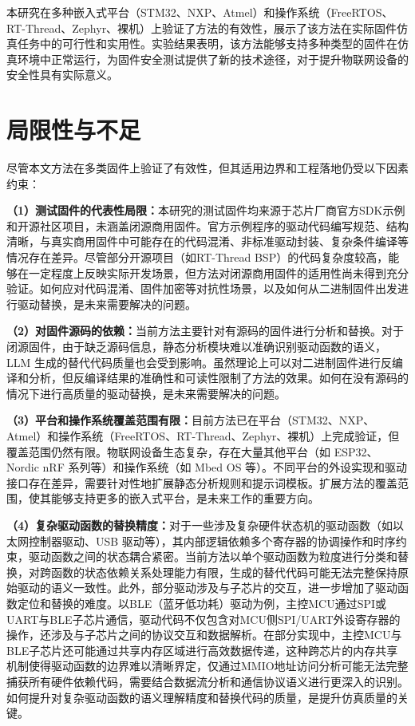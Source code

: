 本研究在多种嵌入式平台（STM32、NXP、Atmel）和操作系统（FreeRTOS、RT-Thread、Zephyr、裸机）上验证了方法的有效性，展示了该方法在实际固件仿真任务中的可行性和实用性。实验结果表明，该方法能够支持多种类型的固件在仿真环境中正常运行，为固件安全测试提供了新的技术途径，对于提升物联网设备的安全性具有实际意义。

\section{局限性与不足}
\label{sec:limitation}

尽管本文方法在多类固件上验证了有效性，但其适用边界和工程落地仍受以下因素约束：

\textbf{（1）测试固件的代表性局限：}本研究的测试固件均来源于芯片厂商官方SDK示例和开源社区项目，未涵盖闭源商用固件。官方示例程序的驱动代码编写规范、结构清晰，与真实商用固件中可能存在的代码混淆、非标准驱动封装、复杂条件编译等情况存在差异。尽管部分开源项目（如RT-Thread BSP）的代码复杂度较高，能够在一定程度上反映实际开发场景，但方法对闭源商用固件的适用性尚未得到充分验证。如何应对代码混淆、固件加密等对抗性场景，以及如何从二进制固件出发进行驱动替换，是未来需要解决的问题。

\textbf{（2）对固件源码的依赖：}当前方法主要针对有源码的固件进行分析和替换。对于闭源固件，由于缺乏源码信息，静态分析模块难以准确识别驱动函数的语义，LLM 生成的替代代码质量也会受到影响。虽然理论上可以对二进制固件进行反编译和分析，但反编译结果的准确性和可读性限制了方法的效果。如何在没有源码的情况下进行高质量的驱动替换，是未来需要解决的问题。

\textbf{（3）平台和操作系统覆盖范围有限：}目前方法已在平台（STM32、NXP、Atmel）和操作系统（FreeRTOS、RT-Thread、Zephyr、裸机）上完成验证，但覆盖范围仍然有限。物联网设备生态复杂，存在大量其他平台（如 ESP32、Nordic nRF 系列等）和操作系统（如 Mbed OS 等）。不同平台的外设实现和驱动接口存在差异，需要针对性地扩展静态分析规则和提示词模板。扩展方法的覆盖范围，使其能够支持更多的嵌入式平台，是未来工作的重要方向。

\textbf{（4）复杂驱动函数的替换精度：}对于一些涉及复杂硬件状态机的驱动函数（如以太网控制器驱动、USB 驱动等），其内部逻辑依赖多个寄存器的协调操作和时序约束，驱动函数之间的状态耦合紧密。当前方法以单个驱动函数为粒度进行分类和替换，对跨函数的状态依赖关系处理能力有限，生成的替代代码可能无法完整保持原始驱动的语义一致性。此外，部分驱动涉及与子芯片的交互，进一步增加了驱动函数定位和替换的难度。以BLE（蓝牙低功耗）驱动为例，主控MCU通过SPI或UART与BLE子芯片通信，驱动代码不仅包含对MCU侧SPI/UART外设寄存器的操作，还涉及与子芯片之间的协议交互和数据解析。在部分实现中，主控MCU与BLE子芯片还可能通过共享内存区域进行高效数据传递，这种跨芯片的内存共享机制使得驱动函数的边界难以清晰界定，仅通过MMIO地址访问分析可能无法完整捕获所有硬件依赖代码，需要结合数据流分析和通信协议语义进行更深入的识别。如何提升对复杂驱动函数的语义理解精度和替换代码的质量，是提升仿真质量的关键。

